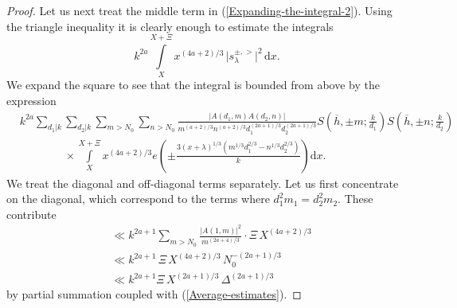 \documentclass[a4paper,10pt,twoside]{amsart}
\theoremstyle{definition}
\numberwithin{equation}{section}
\renewcommand\:{\colon}
\begin{document}
\begin{proof}
Let us next treat the middle term in (\ref{Expanding-the-integral-2}). Using the triangle inequality it is clearly enough to estimate the integrals
\[k^{2a}\int\limits_X^{X+\Xi}x^{(4a+2)/3}\,\bigl|s_\lambda^{\pm,>}\bigr|^2\,\mathrm dx.\]
We expand the square to see that the integral is bounded from above by the expression
\begin{align*}
&k^{2a}\sum_{d_1|k}\sum_{d_2|k}\sum_{m>N_0}\sum_{n>N_0}\frac{\left|A\left(d_1,m\right)A\left(d_2,n\right)\right|}{m^{(a+2)/3}n^{(a+2)/3}d_1^{(2a+1)/3}d_2^{(2a+1)/3}}S\left(\overline h,\pm m;\frac k{d_1}\right)S\left(\overline h,\pm n;\frac k{d_2}\right)\\
&\qquad\qquad\times\int\limits_X^{X+\Xi}x^{(4a+2)/3}e\left(\pm\frac{3\left(x+\lambda\right)^{1/3}\left(m^{1/3}d_1^{2/3}-n^{1/3}d_2^{2/3}\right)}k\right)\mathrm d x.
\end{align*}
We treat the diagonal and off-diagonal terms separately. Let us first concentrate on the diagonal, which correspond to the terms where $d_1^2m_1=d_2^2m_2$. These contribute
\begin{align}\label{Estimate-5}
&\ll k^{2a+1}\sum_{m>N_0}\frac{\left|A(1,m)\right|^2}{m^{(2a+4)/3}}\cdot\Xi\,X^{(4a+2)/3} \nonumber\\
&\ll k^{2a+1}\,\Xi\,X^{(4a+2)/3}\,N_0^{-(2a+1)/3} \nonumber\\
&\ll k^{2a+1}\Xi\,X^{(2a+1)/3}\,\Delta^{(2a+1)/3}
\end{align}
by partial summation coupled with (\ref{Average-estimates}). 


\end{proof}
\end{document}
